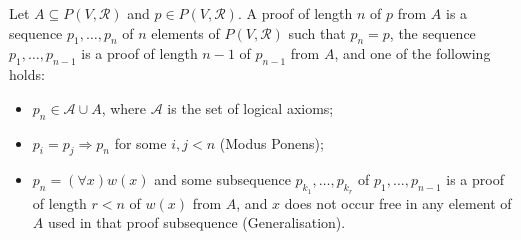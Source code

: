 Let $A \subseteq P(V, \mathcal{R})$ and $p \in P(V, \mathcal{R})$. A proof of length $n$ of $p$ from $A$ is a sequence $p_1, \ldots, p_n$ of $n$ elements of $P(V, \mathcal{R})$ such that $p_n = p$, the sequence $p_1, \ldots, p_{n-1}$ is a proof of length $n-1$ of $p_{n-1}$ from $A$, and one of the following holds:
\begin{itemize}
\item[(a)] $p_n \in \mathcal{A} \cup A$, where $\mathcal{A}$ is the set of logical axioms;
\item[(b)] $p_i = p_j \Rightarrow p_n$ for some $i, j < n$ (Modus Ponens);
\item[(c)] $p_n = (\forall x)w(x)$ and some subsequence $p_{k_1}, \ldots, p_{k_r}$ of $p_1, \ldots, p_{n-1}$ is a proof of length $r < n$ of $w(x)$ from $A$, and $x$ does not occur free in any element of $A$ used in that proof subsequence (Generalisation).
\end{itemize}

